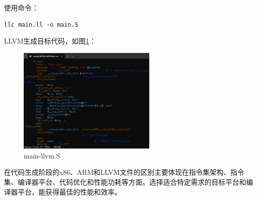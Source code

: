 \documentclass[UTF8,a4paper,10pt]{ctexart}
\begin{document}
使用命令：
\begin{lstlisting}[frame=trbl]
  llc main.ll -o main.S
\end{lstlisting}\par
LLVM生成目标代码，如图\ref{fig:12}：
\begin{figure}[H]
    \centering
    \includegraphics[width=0.6\textwidth,height=0.7\textwidth]{imgs/main_llvm.png}
    \caption{main-llvm.S}
    \label{fig:12}
\end{figure}
在代码生成阶段的x86、ARM和LLVM文件的区别主要体现在指令集架构、指令集、编译器平台、代码优化和性能功耗等方面。选择适合特定需求的目标平台和编译器平台，能获得最佳的性能和效率。



\end{document}
